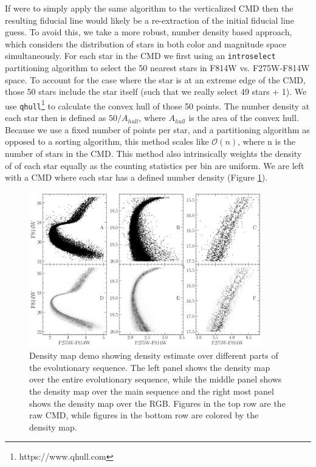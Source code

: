 If \fidanka were to simply apply the same algorithm to the verticalized CMD
then the resulting fiducial line would likely be a re-extraction of the initial
fiducial line guess. To avoid this, we take a more robust, number density based
approach, which considers the distribution of stars in both color and magnitude
space simultaneously. For each star in the CMD we first using an
\texttt{introselect} partitioning algorithm to select the 50 nearest stars in
F814W vs. F275W-F814W space. To account for the case where the star is at an
extreme edge of the CMD, those 50 stars include the star itself (such that we
really select 49 stars + 1). We use
\texttt{qhull}\footnote{https://www.qhull.com}\citep{Barber1996} to calculate
the convex hull of those 50 points. The number density at each star then is
defined as $50/A_{hull}$, where $A_{hull}$ is the area of the convex hull.
Because we use a fixed number of points per star, and a partitioning algorithm
as opposed to a sorting algorithm, this method scales like $\mathcal{O}(n)$,
where n is the number of stars in the CMD. This method also intrinsically
weights the density of of each star equally as the counting statistics per bin
are uniform. We are left with a CMD where each star has a defined number
density (Figure \ref{densityMapDemo}).

\begin{figure}
	\centering
	\includegraphics[width=0.9\textwidth]{DensityMapDemo.png}
	\caption{Density map demo showing density estimate over different parts of
	the evolutionary sequence. The left panel shows the density map over the
	entire evolutionary sequence, while the middle panel shows the density map
	over the main sequence and the right most panel shows the density map over
	the RGB. Figures in the top row are the raw CMD, while figures in the
	bottom row are colored by the density map.}
	\label{densityMapDemo}
\end{figure}

